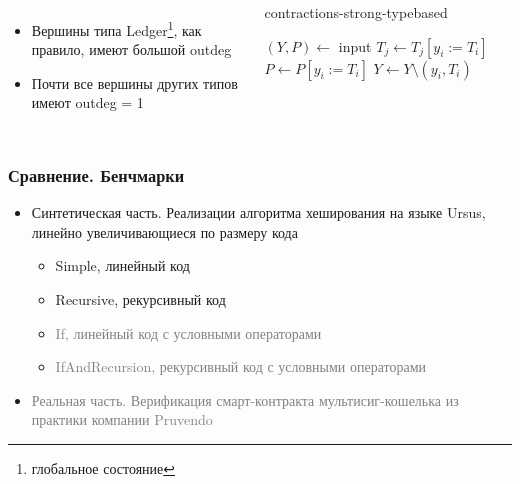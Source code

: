 \documentclass{beamer}
\begin{document}
\begin{frame}
\begin{columns}
  \begin{itemize}
    \item Вершины типа Ledger\footnote{глобальное состояние}, как правило, имеют большой outdeg
    \item Почти все вершины других типов имеют outdeg = 1
  \end{itemize}
  \begin{megaalgorithm}\tiny 
    \caption{\tiny contractions-strong-typebased}
  \begin{algorithmic}
    \State $(Y, P)\gets$ input
        \If{\textcolor{red}{$typeof(y_i)$ is not $Ledger$}}
                \State $T_j \gets T_j [y_i := T_i]$
            \EndFor
            \State $P \gets P [y_i := T_i]$
            \State $Y\gets Y \setminus (y_i, T_i)$
        \EndIf
    \EndFor
    \State {}
  \end{algorithmic}
\end{megaalgorithm}  
  \end{columns}
\end{frame}

\begin{frame}\frametitle{Сравнение. Бенчмарки}
  \begin{itemize}
    \item Синтетическая часть. Реализации алгоритма хеширования на языке Ursus, линейно увеличивающиеся по размеру кода
    \begin{itemize}
      \item Simple, линейный код
      \item Recursive, рекурсивный код
      \item \textcolor{gray}{If, линейный код с условными операторами}
      \item \textcolor{gray}{IfAndRecursion, рекурсивный код с условными операторами}
    \end{itemize}
    \item \textcolor{gray}{Реальная часть. Верификация смарт-контракта мультисиг-кошелька из практики компании Pruvendo}
  \end{itemize}
  \end{frame}
\end{document}
